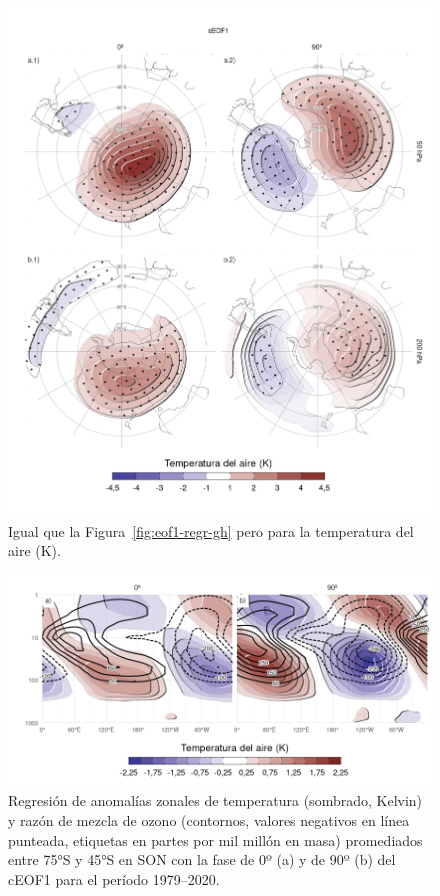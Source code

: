 \documentclass[12pt,oneside,a4paper]{reedthesis}
\begin{document}
\begin{figure}

{\centering \includegraphics{figures/20-ceofs/eof1-regr-t-1} 

}

\caption{Igual que la Figura~\ref{fig:eof1-regr-gh} pero para la temperatura del aire (K).}\label{fig:eof1-regr-t}
\end{figure}



\begin{figure}

{\centering \includegraphics{figures/20-ceofs/t-vertical-1} 

}

\caption{Regresión de anomalías zonales de temperatura (sombrado, Kelvin) y razón de mezcla de ozono (contornos, valores negativos en línea punteada, etiquetas en partes por mil millón en masa) promediados entre 75°S y 45°S en SON con la fase de 0º (a) y de 90º (b) del cEOF1 para el período 1979--2020.}\label{fig:t-vertical}
\end{figure}
\end{document}
